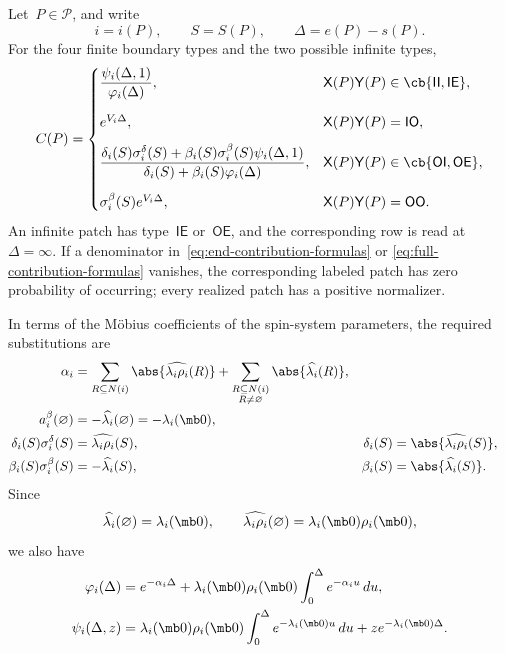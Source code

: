 Let~$P\in\mathcal P$, and write
\begin{equation*}
i=i(P),
\qquad
S=S(P),
\qquad
\Delta=e(P)-s(P).
\end{equation*}
For the four finite boundary types and the two possible infinite types,
\begin{equation}
\label{eq:full-contribution-formulas}
C(P)
=
\begin{cases}
\displaystyle
\frac{\psi_i(\Delta,1)}{\varphi_i(\Delta)},
&\mathsf X(P)\mathsf Y(P)\in\cb{\mathsf{II},\mathsf{IE}},
\\[1.4em]
e^{V_i\Delta},
&\mathsf X(P)\mathsf Y(P)=\mathsf{IO},
\\[0.8em]
\displaystyle
\frac{
\delta_i(S)\sigma_i^\delta(S)
+
\beta_i(S)\sigma_i^\beta(S)\psi_i(\Delta,1)
}{
\delta_i(S)+\beta_i(S)\varphi_i(\Delta)
},
&\mathsf X(P)\mathsf Y(P)\in\cb{\mathsf{OI},\mathsf{OE}},
\\[1.4em]
\sigma_i^\beta(S)e^{V_i\Delta},
&\mathsf X(P)\mathsf Y(P)=\mathsf{OO}.
\end{cases}
\end{equation}
An infinite patch has type~$\mathsf{IE}$ or~$\mathsf{OE}$, and the
corresponding row is read at~$\Delta=\infty$. If a denominator
in~\eqref{eq:end-contribution-formulas} or
\eqref{eq:full-contribution-formulas} vanishes, the corresponding labeled patch
has zero probability of occurring; every realized patch has a positive
normalizer.

In terms of the M\"obius coefficients of the spin-system parameters, the
required substitutions are
\begin{equation}
\label{eq:dual-to-spin-contribution-data}
\begin{aligned}
\alpha_i
&=
\sum_{R\subseteq N(i)}\abs{\widehat{\lambda_i\rho_i}(R)}
+
\sum_{\substack{R\subseteq N(i)\\R\neq\varnothing}}
\abs{\widehat{\lambda_i}(R)},
\\
a_i^\beta(\varnothing)
&=
-\widehat{\lambda_i}(\varnothing)
=
-\lambda_i(\mb 0),
\\
\delta_i(S)\sigma_i^\delta(S)
&=
\widehat{\lambda_i\rho_i}(S),
&\delta_i(S)
&=
\abs{\widehat{\lambda_i\rho_i}(S)},
\\
\beta_i(S)\sigma_i^\beta(S)
&=
-\widehat{\lambda_i}(S),
&\beta_i(S)
&=
\abs{\widehat{\lambda_i}(S)}.
\end{aligned}
\end{equation}
Since
\begin{equation*}
\widehat{\lambda_i}(\varnothing)=\lambda_i(\mb 0),
\qquad
\widehat{\lambda_i\rho_i}(\varnothing)
=
\lambda_i(\mb 0)\rho_i(\mb 0),
\end{equation*}
we also have
\begin{align*}
\varphi_i(\Delta)
&=
e^{-\alpha_i\Delta}
+
\lambda_i(\mb 0)\rho_i(\mb 0)
\int_0^\Delta e^{-\alpha_i u}\,du,
\\
\psi_i(\Delta,z)
&=
\lambda_i(\mb 0)\rho_i(\mb 0)
\int_0^\Delta e^{-\lambda_i(\mb 0)u}\,du
+
z e^{-\lambda_i(\mb 0)\Delta}.
\end{align*}

